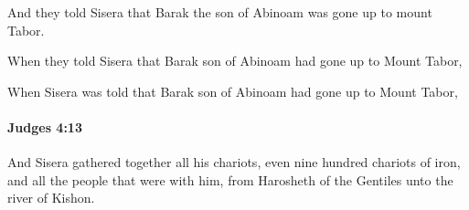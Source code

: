 			\begin{versebox}
					\item[BHS] 
					\item[ASV] And they told Sisera that Barak the son of Abinoam was gone up to mount Tabor.
					\item[NIV] When they told Sisera that Barak son of Abinoam had gone up to Mount Tabor,
					\item[NRSV] When Sisera was told that Barak son of Abinoam had gone up to Mount Tabor,
			\end{versebox}

		\paragraph{Judges 4:13} %
			\label{JUDGES-4-13}

			And Sisera gathered together all his chariots, even nine hundred chariots of iron, and all the people that were with him, from Harosheth of the Gentiles unto the river of Kishon.

